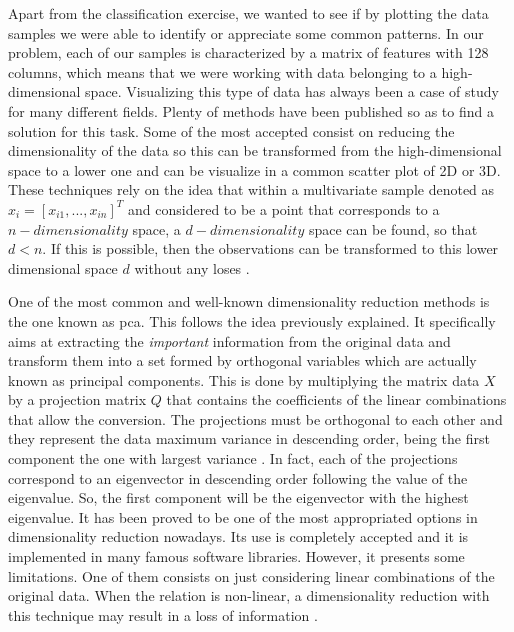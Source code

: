 	Apart from the classification exercise, we wanted to see if by plotting the data samples we were able to identify or appreciate some common patterns. In our problem, each of our samples is characterized by a matrix of features with 128 columns, which means that we were working with data belonging to a high-dimensional space. Visualizing this type of data has always been a case of study for many different fields. Plenty of methods have been published so as to find a solution for this task. Some of the most accepted consist on reducing the dimensionality of the data so this can be transformed from the high-dimensional space to a lower one and can be visualize in a common scatter plot of 2D or 3D. These techniques rely on the idea that within a multivariate sample denoted as $x_i = [x_{i1},..., x_{in}]^T$ and considered to be a point that corresponds to a $n-dimensionality$ space, a $d-dimensionality$ space can be found, so that $d < n$. %
	If this is possible, then the observations can be transformed to this lower dimensional space $d$ without any loses \cite{Kaski2011}. 
	
	One of the most common and well-known dimensionality reduction methods is the one known as \acrfull{pca}. This follows the idea previously explained. It specifically aims at extracting the \textit{important} information from the original data and transform them into a set formed by orthogonal variables which are actually known as principal components. This is done by multiplying the matrix data $X$ by a projection matrix $Q$ that contains the coefficients of the linear combinations that allow the conversion. The projections must be orthogonal to each other and they represent the data maximum variance in descending order, being the first component the one with largest variance \cite{Abdi2010}. In fact, each of the projections correspond to an eigenvector in descending order following the value of the eigenvalue. So, the first component will be the eigenvector with the highest eigenvalue. It has been proved to be one of the most appropriated options in dimensionality reduction nowadays. Its use is completely accepted and it is implemented in many famous software libraries. However, it presents some limitations. One of them consists on just considering linear combinations of the original data. When the relation is non-linear, a dimensionality reduction with this technique may result in a loss of information \cite{AmatRodrigo2017}. 
	
